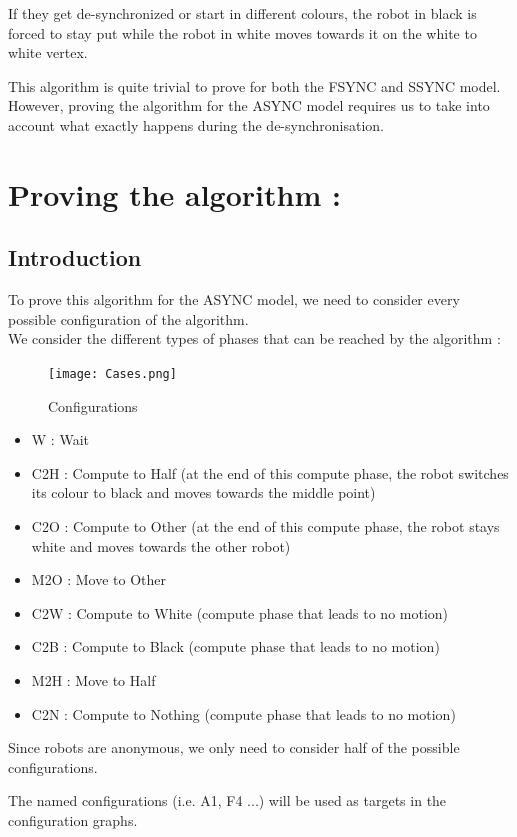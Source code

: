 \documentclass[11pt]{article}
\begin{document}
If they get de-synchronized or start in different colours, the robot in black is forced to stay put while the robot in white moves towards it on the white to white vertex.

This algorithm is quite trivial to prove for both the FSYNC and SSYNC model. However, proving the algorithm for the ASYNC model requires us to take into account what exactly happens during the de-synchronisation.


\section{Proving the algorithm :}

\subsection{Introduction}

To prove this algorithm for the ASYNC model, we need to consider every possible configuration of the algorithm.
\\
We consider the different types of phases that can be reached by the algorithm : 
\begin{figure}[H]
	\centering
	\texttt{[image: Cases.png]}
	\caption{Configurations}
\end{figure}

\begin{itemize}
\item W : Wait
\item C2H : Compute to Half (at the end of this compute phase, the robot switches its colour to black and moves towards the middle point)
\item C2O : Compute to Other (at the end of this compute phase, the robot stays white and moves towards the other robot)
\item M2O : Move to Other
\item C2W : Compute to White (compute phase that leads to no motion)
\item C2B : Compute to Black (compute phase that leads to no motion)
\item M2H : Move to Half
\item C2N : Compute to Nothing (compute phase that leads to no motion)
\end{itemize}

Since robots are anonymous, we only need to consider half of the possible configurations. 

The named configurations (i.e. A1, F4 ...) will be used as targets in the configuration graphs. 
\end{document}
